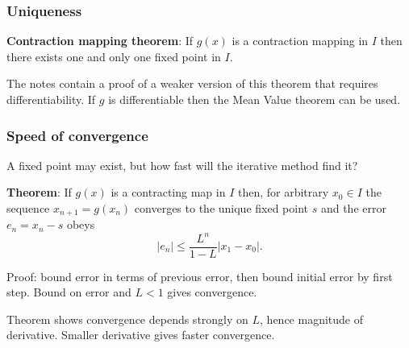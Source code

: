 \documentclass{beamer}
\begin{document}
\begin{frame}
  \frametitle{Uniqueness}

  {\bf Contraction mapping theorem}: If $g(x)$ is a contraction
  mapping in $I$ then there exists one and only one fixed point in
  $I$. \pause

  \vspace{3ex}

  The notes contain a proof of a weaker version of this theorem that
  requires differentiability. If $g$ is differentiable then the Mean
  Value theorem can be used.

\end{frame}

\begin{frame}
  \frametitle{Speed of convergence}

  A fixed point may exist, but how fast will the iterative method find
  it? \pause

  \vspace{1ex}

  {\bf Theorem}: If $g(x)$ is a contracting map in $I$ then, for
  arbitrary $x_0 \in I$ the sequence $x_{n+1} = g(x_n)$ converges to
  the unique fixed point $s$ and the error $e_n = x_n - s$ obeys
  \begin{equation*}
    |e_n| \leq \frac{L^n}{1 - L} |x_1 - x_0|.
  \end{equation*} \pause

  \vspace{1ex}

  Proof: bound error in terms of previous error, then bound initial error by first step. Bound on error and $L < 1$ gives convergence. \pause

  \vspace{1ex}

  Theorem shows convergence depends strongly on $L$, hence magnitude of derivative. Smaller derivative gives faster convergence.

\end{frame}
\end{document}
